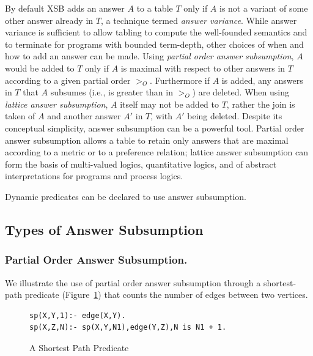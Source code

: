 %
By default XSB adds an answer $A$ to a table $T$ only if $A$ is not a
variant of some other answer already in $T$, a technique termed {\em
  answer variance}.  While answer variance is sufficient to allow
tabling to compute the well-founded semantics and to terminate for
programs with bounded term-depth, other choices of when and how to add
an answer can be made.  Using {\em partial order answer subsumption},
$A$ would be added to $T$ only if $A$ is maximal with respect to other
answers in $T$ according to a given partial order $>_O$. Furthermore
if $A$ is added, any answers in $T$ that $A$ subsumes (i.e., is
greater than in $>_O$) are deleted.  When using {\em lattice answer
  subsumption}, $A$ itself may not be added to $T$, rather the join is
taken of $A$ and another answer $A'$ in $T$, with $A'$ being deleted.
Despite its conceptual simplicity, answer subsumption can be a
powerful tool.  Partial order answer subsumption allows a table to
retain only answers that are maximal according to a metric or to a
preference relation; lattice answer subsumption can form the basis of
multi-valued logics, quantitative logics, and of abstract
interpretations for programs and process logics.

Dynamic predicates can be declared to use answer subsumption.
%

\subsection{Types of Answer Subsumption}

\subsubsection{Partial Order Answer Subsumption.}
% 
We illustrate the use of partial order answer subsumption through a
shortest-path predicate (Figure~\ref{fig:sp-preds}) that counts the
number of edges between two vertices.
%
\begin{figure}[htb]
{\small
\begin{verbatim}
sp(X,Y,1):- edge(X,Y).
sp(X,Z,N):- sp(X,Y,N1),edge(Y,Z),N is N1 + 1.
\end{verbatim}
} 
\caption{A Shortest Path Predicate}\label{fig:sp-preds}
\end{figure}

